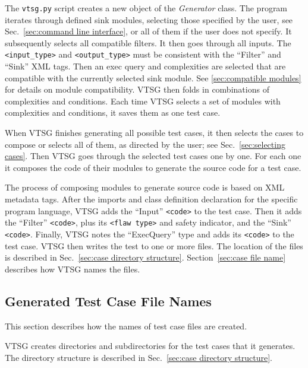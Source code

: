 The \verb|vtsg.py| script creates a new object of the \emph{Generator} class.
The program iterates through defined sink modules, selecting those specified by
the user, see Sec.~\ref{sec:command line interface}, or all of them if the user
does not specify.  It subsequently selects all compatible filters.  It then goes
through all inputs.  The \verb|<input_type>| and \verb|<output_type>| must be
consistent with the ``Filter'' and ``Sink'' XML tags.  Then an exec query and
complexities are selected that are compatible with the currently selected sink
module.  See \ref{sec:compatible modules} for details on module compatibility.
VTSG then folds in combinations of complexities and conditions.
Each time VTSG selects a set of modules with complexities and conditions, it saves
them as one test case.

When VTSG finishes generating all possible test cases, it then selects the cases
to compose or selects all of them, as directed by the user; see
Sec.~\ref{sec:selecting cases}.  Then VTSG goes through the selected test cases
one by one.  For each one it composes the code of their modules to generate the
source code for a test case.

The process of composing modules to generate
source code is based on XML metadata tags.  After the imports and class
definition declaration for the specific program language, VTSG adds the ``Input''
\verb|<code>| to the test case.  Then it adds the ``Filter'' \verb|<code>|, plus its
\verb|<flaw type>| and safety indicator, and the ``Sink'' \verb|<code>|.
Finally, VTSG notes the ``ExecQuery'' type and adds its \verb|<code>| to the test
case.  VTSG then writes the test to one or more files.  The location of the files is
described in Sec.~\ref{sec:case directory structure}.
Section~\ref{sec:case file name} describes how VTSG names the files.

\subsection{Generated Test Case File Names}

This section describes how the names of test case files are created.

VTSG creates directories and subdirectories for the test cases that it generates.
The directory structure is described in
Sec.~\ref{sec:case directory structure}.

\label{sec:case file name}

